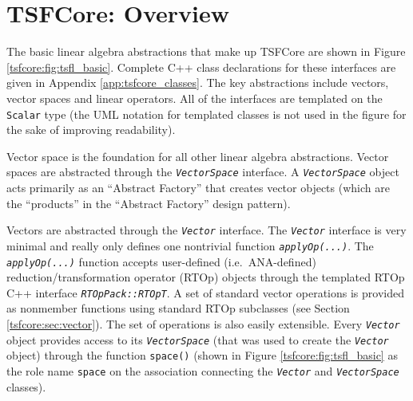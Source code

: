 %
\section{TSFCore: Overview}
\label{tsfcore:sec:TSFCore_core_overview}
%

The basic linear algebra abstractions that make up TSFCore are shown
in Figure {}\ref{tsfcore:fig:tsfl_basic}.  Complete C++ class
declarations for these interfaces are given in Appendix
{}\ref{app:tsfcore_classes}.  The key abstractions include vectors,
vector spaces and linear operators.  All of the interfaces are
templated on the {}\texttt{Scalar} type (the UML notation for
templated classes is not used in the figure for the sake of improving
readability).

Vector space is the foundation for all other linear algebra
abstractions.  Vector spaces are abstracted through the
{}\texttt{\textit{VectorSpace}} interface.  A
{}\texttt{\textit{VectorSpace}} object acts primarily as an ``Abstract
Factory'' {}\cite{ref:gama_et_al_1995} that creates vector objects
(which are the ``products'' in the ``Abstract Factory'' design
pattern).

Vectors are abstracted through the {}\texttt{\textit{Vector}}
interface.  The {}\texttt{\textit{Vector}} interface is very minimal
and really only defines one nontrivial function
{}\texttt{\textit{applyOp(\-...)}}.  The
{}\texttt{\textit{applyOp(\-...)}} function accepts user-defined
(i.e.~ANA-defined) reduction/transformation operator (RTOp) objects
through the templated RTOp C++ interface
{}\texttt{\textit{RTOpPack::RTOpT}}.  A set of standard vector
operations is provided as nonmember functions using standard RTOp
subclasses (see Section {}\ref{tsfcore:sec:vector}).  The set of
operations is also easily extensible.  Every
{}\texttt{\textit{Vector}} object provides access to its
{}\texttt{\textit{VectorSpace}} (that was used to create the
{}\texttt{\textit{Vector}} object) through the function
{}\texttt{space()} (shown in Figure {}\ref{tsfcore:fig:tsfl_basic} as
the role name {}\texttt{space} on the association connecting the
{}\texttt{\textit{Vector}} and {}\texttt{\textit{VectorSpace}}
classes).

